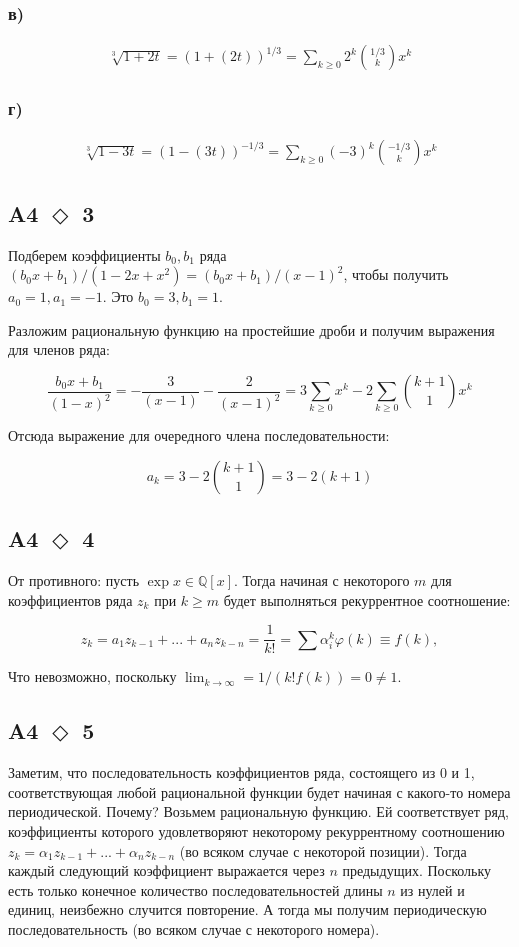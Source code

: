 \documentclass[a4paper]{article}
\renewcommand{\phi}{\varphi}
\newcommand{\task}[2]{A#1 $\Diamond$ #2}
\begin{document}
  \subsubsection*{в)}
  \begin{eqnarray*}
      \sqrt[3]{1 + 2t} = (1 + (2t))^{1/3} = \sum_{k\ge 0} 2^k \binom{1/3}{k}x^k
  \end{eqnarray*}
  \subsubsection*{г)}
  \begin{eqnarray*}
      \sqrt[3]{1 - 3t} = (1 - (3t))^{-1/3} = \sum_{k\ge 0} (-3)^k \binom{-1/3}{k}x^k
  \end{eqnarray*}


  \subsection*{\task{4}{3}}
  Подберем коэффициенты $b_0, b_1$ ряда $(b_0x + b_1) / (1 - 2x + x^2) = (b_0x + b_1)/(x - 1)^2$, чтобы получить $a_0 = 1, a_1 = -1$. Это $b_0 = 3, b_1 = 1$.

  Разложим рациональную функцию на простейшие дроби и получим выражения для членов ряда:

  $$\frac{b_0x + b_1}{(1 -x)^2} = -\frac{3}{(x - 1)} - \frac{2}{(x-1)^2} = 3\sum_{k\ge 0} x^k -2 \sum_{k\ge 0} \binom{k + 1}{1}x^k$$

  Отсюда выражение для очередного члена последовательности:

  $$a_k = 3 - 2\binom{k + 1}{1} = 3 - 2(k + 1)$$

  \subsection*{\task{4}{4}}
  От противного: пусть $\exp x \in \mathbb{Q}\left[x\right]$. Тогда начиная с некоторого $m$ для коэффициентов ряда $z_k$ при $k \ge m$ будет выполняться рекуррентное соотношение:

  $$z_k = a_1 z_{k - 1} + ... + a_n z_{k - n} = \frac{1}{k!} = \sum \alpha_i^k \phi(k) \equiv f(k),$$

  Что невозможно, поскольку $\lim_{k\to \infty} = 1 / (k! f(k)) = 0 \ne 1$.
  \subsection*{\task{4}{5}}
  Заметим, что последовательность коэффициентов ряда, состоящего из 0 и 1, соответствующая любой рациональной функции будет начиная с какого-то номера периодической. Почему? Возьмем рациональную функцию. Ей соответствует ряд, коэффициенты которого удовлетворяют некоторому рекуррентному соотношению
  $z_k = \alpha_1 z_{k - 1} + ... + \alpha_n z_{k - n}$ (во всяком случае с некоторой позиции). Тогда каждый следующий коэффициент выражается через $n$ предыдущих. Поскольку есть только конечное количество последовательностей длины $n$ из нулей и единиц, неизбежно случится повторение. А тогда мы получим периодическую последовательность (во всяком случае с некоторого номера).
\end{document}
